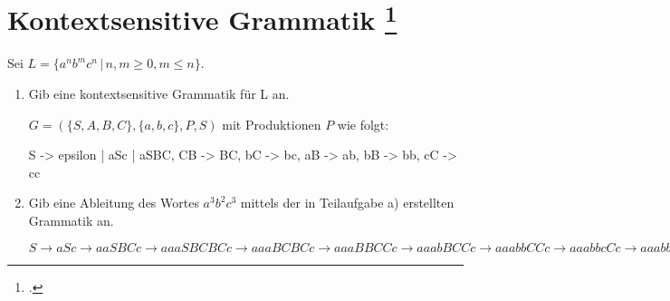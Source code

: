 \documentclass{lehramt-informatik-aufgabe}
\begin{document}
\section{Kontextsensitive Grammatik
\footcite{theo:ab:3}}

Sei $L = \{a^n b^m c^n \, | \, n, m \geq 0, m \leq n \}$.

\begin{enumerate}


\item Gib eine kontextsensitive Grammatik für L an.

\begin{liAntwort}
$G = (\{S, A, B, C\}, \{a, b, c\}, P, S)$ mit Produktionen $P$ wie
folgt:

\begin{liProduktionsRegeln}
S -> epsilon | aSc | aSBC,
CB -> BC,
bC -> bc,
aB -> ab,
bB -> bb,
cC -> cc
\end{liProduktionsRegeln}
\end{liAntwort}


\item Gib eine Ableitung des Wortes $a^3 b^2 c^3$ mittels der in
Teilaufgabe a) erstellten Grammatik an.

\begin{liAntwort}
$S
\rightarrow aSc
\rightarrow aaSBCc
\rightarrow aaaSBCBCc
\rightarrow aaaBCBCc
\rightarrow aaaBBCCc
\rightarrow aaabBCCc
\rightarrow aaabbCCc
\rightarrow aaabbcCc
\rightarrow aaabbccc
$
\end{liAntwort}
\end{enumerate}
\end{document}
